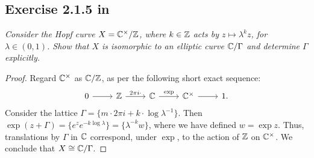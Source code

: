 \documentclass{article}
\begin{document}
\subsection*{Exercise 2.1.5 in \cite{Huy}}
\emph{Consider the Hopf curve $X = \mathbb{C}^{\times} / \mathbb{Z}$, where $k \in \mathbb{Z}$ acts by $z \mapsto \lambda^k z$, for
$\lambda \in (0,1)$. Show that $X$ is isomorphic to an elliptic curve $\mathbb{C}/\Gamma$ and determine $\Gamma$
explicitly.}
\begin{proof}
Regard $\mathbb{C}^{\times}$ as $\mathbb{C} / \mathbb{Z}$, as per the following short exact sequence:
\[
\begin{tikzcd}
0\arrow{r} & \Z\arrow{r}{2\pi i \cdot} & \C \arrow{r}{\exp} & \C^{\times} \arrow{r} & 1.
\end{tikzcd}
\]
Consider the lattice $\Gamma = \{ m \cdot 2\pi i + k \cdot \log \lambda^{-1} \}$. Then $\exp(z + \Gamma) =
\{ e^z e^{- k \log \lambda} \} = \{ \lambda^{-k} w \}$, where we have defined $w = \exp z$. Thus, translations
by $\Gamma$ in $\mathbb{C}$ correspond, under $\exp$, to the action of $\mathbb{Z}$ on $\mathbb{C}^{\times}$. We conclude that
$X \cong \mathbb{C}/\Gamma$.
\end{proof}
\end{document}
